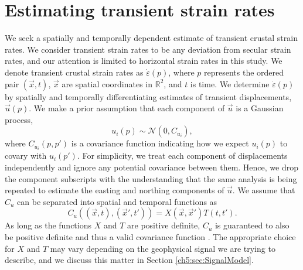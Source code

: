 \section{Estimating transient strain rates}\label{ch5:sec:Method}
We seek a spatially and temporally dependent estimate of transient
crustal strain rates. We consider transient strain rates to be any
deviation from secular strain rates, and our attention is limited to
horizontal strain rates in this study. We denote transient crustal
strain rates as $\dot\varepsilon(p)$, where $p$ represents the ordered
pair $(\vec{x},t)$, $\vec{x}$ are spatial coordinates in
$\mathbb{R}^2$, and $t$ is time. We determine $\dot\varepsilon(p)$ by
spatially and temporally differentiating estimates of transient
displacements, $\vec{u}(p)$. We make a prior assumption that each
component of $\vec{u}$ is a Gaussian process,
\begin{equation}\label{ch5:eq:TransientDeformation}
u_i(p) \sim \mathcal{N}\left(0,C_{u_i}\right),
\end{equation}
where $C_{u_i}(p,p')$ is a covariance function indicating how we
expect $u_i(p)$ to covary with $u_i(p')$. For simplicity, we treat
each component of displacements independently and ignore any potential
covariance between them. Hence, we drop the component subscripts with
the understanding that the same analysis is being repeated to estimate
the easting and northing components of $\vec{u}$. We assume that $C_u$
can be separated into spatial and temporal functions as
\begin{equation}\label{ch5:eq:TransientCovariance}
C_{u}\left((\vec{x},t),(\vec{x}',t')\right) = X(\vec{x},\vec{x}')T(t,t').
\end{equation}  
As long as the functions $X$ and $T$ are positive definite, $C_u$ is
guaranteed to also be positive definite and thus a valid covariance
function \citep[sec. 4.2.4]{Rasmussen2006}. The appropriate choice for
$X$ and $T$ may vary depending on the geophysical signal we are trying
to describe, and we discuss this matter in Section
\ref{ch5:sec:SignalModel}.

